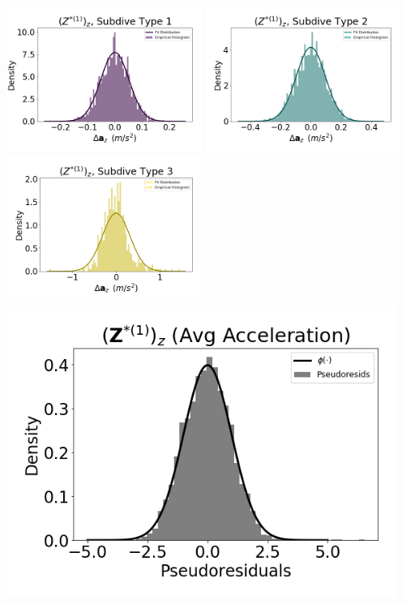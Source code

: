 \documentclass[12pt]{TD-CJS}
\begin{document}
\newpage

\includegraphics[width=2.5in]{../Plots/CarHHMM2_empirical_hist_Az_0.png}
\includegraphics[width=2.5in]{../Plots/CarHHMM2_empirical_hist_Az_1.png}
\includegraphics[width=2.5in]{../Plots/CarHHMM2_empirical_hist_Az_2.png}
\includegraphics[width=5in]{../Plots/CarHHMM2_psedoresids_Az.png}
\end{document}
